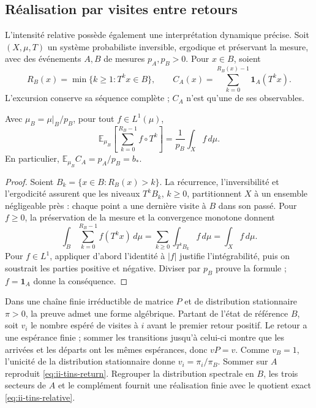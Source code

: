 \subsection{Réalisation par visites entre retours}
\label{subsec:ii-tins-retornos}

L’intensité relative possède également une interprétation dynamique précise.
Soit $(X,\mu,T)$ un système probabiliste inversible, ergodique et préservant
la mesure, avec des événements $A,B$ de mesures $p_A,p_B>0$. Pour $x\in B$, soient
\[
 R_B(x)=\min\{k\ge1:T^kx\in B\},\qquad
 C_A(x)=\sum_{k=0}^{R_B(x)-1}\mathbf1_A(T^kx).
\]
L’excursion conserve sa séquence complète ; $C_A$ n’est qu’une de ses observables.

\begin{theorem}
\label{thm:ii-tins-return}
Avec $\mu_B=\mu|_B/p_B$, pour tout $f\in L^1(\mu)$,
\begin{equation}
 \mathbb E_{\mu_B}\!\left[\sum_{k=0}^{R_B-1}f\circ T^k\right]
 =\frac1{p_B}\int_Xf\,d\mu.
 \label{eq:ii-tins-return}
\end{equation}
En particulier, $\mathbb E_{\mu_B}C_A=p_A/p_B=b_*$.
\end{theorem}
\begin{proof}
Soient $B_k=\{x\in B:R_B(x)>k\}$. La récurrence, l’inversibilité et
l’ergodicité assurent que les niveaux $T^kB_k$, $k\ge0$, partitionnent $X$
à un ensemble négligeable près : chaque point a une dernière visite à $B$ dans son
passé. Pour $f\ge0$, la préservation de la mesure et la convergence monotone donnent
\[
 \int_B\sum_{k=0}^{R_B-1}f(T^kx)\,d\mu
 =\sum_{k\ge0}\int_{T^kB_k}f\,d\mu=\int_Xf\,d\mu.
\]
Pour $f\in L^1$, appliquer d’abord l’identité à $|f|$ justifie
l’intégrabilité, puis on soustrait les parties positive et négative.
Diviser par $p_B$ prouve la formule ; $f=\mathbf1_A$ donne la conséquence.
\end{proof}

Dans une chaîne finie irréductible de matrice $P$ et de distribution stationnaire
$\pi>0$, la preuve admet une forme algébrique. Partant de l’état de
référence $B$, soit $v_i$ le nombre espéré de visites à $i$ avant le
premier retour positif. Le retour a une espérance finie ; sommer les
transitions jusqu’à celui-ci montre que les arrivées et les départs ont les mêmes
espérances, donc $vP=v$. Comme $v_B=1$, l’unicité de la distribution
stationnaire donne $v_i=\pi_i/\pi_B$. Sommer sur $A$ reproduit
\eqref{eq:ii-tins-return}. Regrouper la distribution spectrale en $B$, les
trois secteurs de $A$ et le complément fournit une réalisation finie
avec le quotient exact \eqref{eq:ii-tins-relative}.

